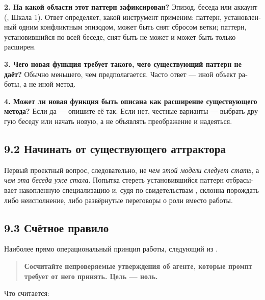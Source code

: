 \begin{russian}
\textbf{2. На какой области этот паттерн зафиксирован?} Эпизод, беседа или аккаунт (, Шкала 1). Ответ определяет, какой инструмент применим: паттерн, установленный одним конфликтным эпизодом, может быть снят сбросом ветки; паттерн, установившийся по всей беседе, снят быть не может и может быть только расширен.

\textbf{3. Чего новая функция требует такого, чего существующий паттерн не даёт?} Обычно меньшего, чем предполагается. Часто ответ — иной объект работы, а не иной метод.

\textbf{4. Может ли новая функция быть описана как расширение существующего метода?} Если да — опишите её так. Если нет, честные варианты — выбрать другую беседу или начать новую, а не объявлять преображение и надеяться.


\subsection*{9.2 Начинать от существующего аттрактора}
\label{sec:ru:9.2}

Первый проектный вопрос, следовательно, не \emph{чем этой модели следует стать}, а \emph{чем эта беседа уже стала}. Попытка стереть установившийся паттерн отбрасывает накопленную специализацию и, судя по свидетельствам , склонна порождать либо неисполнение, либо развёрнутые переговоры о роли вместо работы.


\subsection*{9.3 Счётное правило}
\label{sec:ru:9.3}

Наиболее прямо операциональный принцип работы, следующий из .

\begin{quote}
\textbf{Сосчитайте непроверяемые утверждения об агенте, которые промпт требует от него принять. Цель — ноль.}
\end{quote}
Что считается:


\end{russian}
